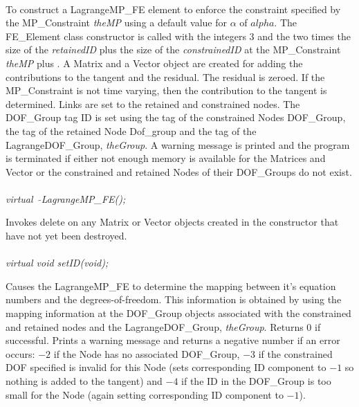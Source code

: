  \\ 
 \\  
 \\  
\\

  \\
\\
To construct a LagrangeMP\_FE element to enforce the constraint
specified by the MP\_Constraint {\em theMP} using a default value for
$\alpha$ of $alpha$. The FE\_Element class constructor is called with
the integers $3$ and the two times the size of the {\em retainedID}
plus the size of the {\em constrainedID} at the MP\_Constraint {\em
theMP} plus . A Matrix and a Vector object are created for adding the
contributions to the tangent and the residual. The residual is
zeroed. If the
MP\_Constraint is not time varying, then the contribution to the
tangent is determined. Links are set to the retained and constrained
nodes. The DOF\_Group tag ID is set using the tag of the constrained
Nodes DOF\_Group, the tag of the retained Node Dof\_group and the tag
of the LagrangeDOF\_Group, {\em theGroup}. A warning message is printed and 
the program is terminated if either not enough memory is available for
the Matrices and Vector or the constrained and retained Nodes of their
DOF\_Groups do not exist. \\



  \\
{\em virtual~ $\tilde{}$LagrangeMP\_FE();}  

Invokes delete on any Matrix or Vector objects created in the
constructor that have not yet been destroyed. \\

  \\
{\em virtual void setID(void);} 

Causes the LagrangeMP\_FE to determine the mapping between it's equation
numbers and the degrees-of-freedom. This information is obtained by
using the mapping information at the DOF\_Group objects associated with
the constrained and retained nodes and the LagrangeDOF\_Group, {\em
theGroup}. Returns $0$ if
successful. Prints a warning message and returns a negative number if
an error occurs: $-2$ if the
Node has no associated DOF\_Group, $-3$ if the constrained DOF
specified is invalid for this Node (sets corresponding ID component to
$-1$ so nothing is added to the tangent) and $-4$ if the ID in the
DOF\_Group is too small for the Node (again setting corresponding ID
component to $-1$). \\ 

